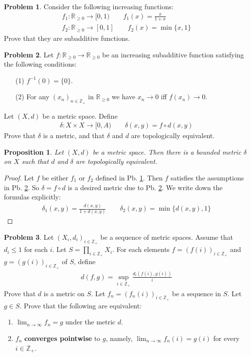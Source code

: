 \documentclass[12pt,b5paper,notitlepage]{article}
\theoremstyle{definition}
\newtheorem{prob}{\color{red}Problem}[section]
\theoremstyle{plain}
\newtheorem{pp}[df]{Proposition}
\newcommand{\Zbb}{\mathbb Z}
\newcommand{\Rbb}{\mathbb R}
\newcommand{\dps}{\displaystyle}
\numberwithin{equation}{section}
\begin{document}
\begin{prob}\label{lb52}
Consider the following increasing functions:
\begin{gather*}
f_1:\Rbb_{\geq 0}\rightarrow[0,1)\qquad f_1(x)=\frac{x}{1+x}\\
f_2:\Rbb_{\geq 0}\rightarrow[0,1]\qquad f_2(x)=\min\{x,1\}
\end{gather*}
Prove that they are subadditive functions. 
\end{prob}

\begin{prob}\label{lb53}
Let $f:\Rbb_{\geq0}\rightarrow \Rbb_{\geq0}$ be an increasing subadditive function satisfying the following conditions:
\begin{itemize}
\item[(1)] $f^{-1}(0)=\{0\}$.
\item[(2)] For any $(x_n)_{n\in\Zbb_+}$ in $\Rbb_{\geq0}$ we have $x_n\rightarrow 0$ iff $f(x_n)\rightarrow 0$.
\end{itemize}
Let $(X,d)$ be a metric space. Define
\begin{align*}
\delta:X\times X\rightarrow [0,A)\qquad \delta(x,y)=f\circ d(x,y)
\end{align*}  
Prove that $\delta$ is a metric, and that $\delta$ and $d$ are topologically equivalent.
\end{prob}


\begin{pp}\label{lb195}
Let $(X,d)$ be a metric space. Then there is a bounded metric $\delta$ on $X$ such that $d$ and $\delta$ are topologically equivalent.
\end{pp}
\begin{proof}
Let $f$ be either $f_1$ or $f_2$ defined in Pb. \ref{lb52}. Then $f$ satisfies the assumptions in Pb. \ref{lb53}. So $\delta=f\circ d$ is a desired metric due to Pb. \ref{lb53}. We write down the formulas explicitly:
\begin{align*}
\delta_1(x,y)=\frac{d(x,y)}{1+d(x,y)}\qquad \delta_2(x,y)=\min\{d(x,y),1\}
\end{align*}
\end{proof}

\begin{prob}\label{lb78}
Let $(X_i,d_i)_{i\in\Zbb_+}$ be a sequence of metric spaces. Assume that $d_i\leq 1$ for each $i$. Let $\dps S=\prod_{i\in\Zbb_+} X_i$. For each elements $f=(f(i))_{i\in\Zbb_+}$ and $g=(g(i))_{i\in\Zbb_+}$ of $S$, define
\begin{align}
d(f,g)=\sup_{i\in\Zbb_+} \frac {d_i(f(i),g(i))}{i}  \label{eq16}
\end{align} 
Prove that $d$ is a metric on $S$. Let $f_n=(f_n(i))_{i\in\Zbb_+}$ be a sequence in $S$. Let $g\in S$. Prove that the following are equivalent:
\begin{enumerate}[label=(\alph*)]
\item $\dps \lim_{n\rightarrow\infty} f_n=g$ under the metric $d$.
\item $f_n$ \textbf{converges pointwise} to $g$, namely, $\dps\lim_{n\rightarrow\infty} f_n(i)=g(i)$ for every $i\in\Zbb_+$.
\end{enumerate}
\end{prob}
\end{document}
